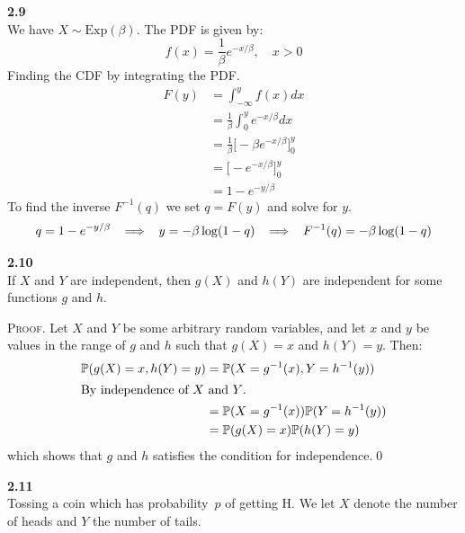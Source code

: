 \bigskip\noindent
\textbf{2.9}\\  %
We have $X\sim \text{Exp}(\beta)$. The PDF is given by:
$$
f(x) = \frac{1}{\beta}e^{-x/\beta},\quad x > 0
$$
Finding the CDF by integrating the PDF.
\begin{align*}
    F(y) &= \int_{-\infty}^y f(x)dx \\
    &= \frac{1}{\beta}\int_0^y e^{-x/\beta}dx\\
    &= \frac{1}{\beta}\big[-\beta e^{-x/\beta}\big]_0^y\\
    &= \big[-e^{-x/\beta}\big]_0^y \\
    &= 1 - e^{-y/\beta}
\end{align*}
To find the inverse $F^{-1}(q)$ we set $q = F(y)$ and solve for $y$.
$$
q = 1 - e^{-y/\beta}
\imp
y = -\beta\log(1 - q)
\imp
F^{-1}(q) = -\beta\log(1 - q)
$$

\bigskip\noindent
\textbf{2.10}\\  %
If $X$ and $Y$ are independent, then $g(X)$ and $h(Y)$ are independent for some functions
$g$ and $h$.

\medskip\noindent
\textsc{Proof}.
Let $X$ and $Y$ be some arbitrary random variables, and let $x$ and $y$ be
values in the range of $g$ and $h$ such that $g(X) = x$ and $h(Y) = y$. Then:
\begin{align*}
    \P(g(X) = x, h(Y) = y) &=
    \P(X = g^{-1}(x), Y = h^{-1}(y)) \\
\shortintertext{By independence of $X$ and $Y$.}
&= \P(X = g^{-1}(x))\P(Y = h^{-1}(y)) \\
&= \P(g(X) = x)\P(h(Y) = y) 
\end{align*}
which shows that $g$ and $h$ satisfies the condition for independence.\qed

\bigskip\noindent
\textbf{2.11}\\  %
Tossing a coin which has probability $p$ of getting H. We let $X$ denote the
number of heads and $Y$ the number of tails.

